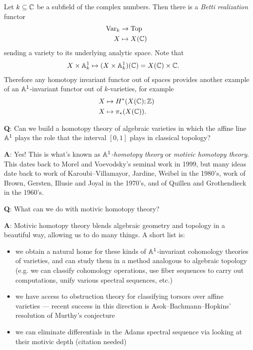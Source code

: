 \documentclass[11pt]{amsart}
\begin{document}
\begin{example} Let $k \subseteq \mathbb{C}$ be a subfield of the complex numbers. Then there is a \textit{Betti realization} functor
\begin{align*}
    \mathrm{Var}_k &\to \mathrm{Top} \\
    X &\mapsto X(\mathbb{C})
\end{align*}
sending a variety to its underlying analytic space. Note that
\begin{align*}
    X \times \mathbb{A}^1_k &\mapsto (X \times \mathbb{A}^1_k)(\mathbb{C}) = X(\mathbb{C}) \times \mathbb{C}.
\end{align*}
Therefore any homotopy invariant functor out of spaces provides another example of an $\mathbb{A}^1$-invariant functor out of $k$-varieties, for example
\begin{align*}
    X &\mapsto H^\ast(X(\mathbb{C});\mathbb{Z}) \\
    X &\mapsto \pi_\ast (X(\mathbb{C})).
\end{align*}
\end{example}


\textbf{Q}: Can we build a homotopy theory of algebraic varieties in which the affine line $\mathbb{A}^1$ plays the role that the interval $[0,1]$ plays in classical topology?

\textbf{A}: Yes! This is what's known as \textit{$\mathbb{A}^1$-homotopy theory} or \textit{motivic homotopy theory}. This dates back to Morel and Voevodsky's seminal work in 1999, but many ideas date back to work of Karoubi--Villamayor, Jardine, Weibel in the 1980's, work of Brown, Gersten, Illusie and Joyal in the 1970's, and of Quillen and Grothendieck in the 1960's.

\textbf{Q}: What can we do with motivic homotopy theory?

\textbf{A}: Motivic homotopy theory blends algebraic geometry and topology in a beautiful way, allowing us to do many things. A short list is:
\begin{itemize}
    \item we obtain a natural home for these kinds of $\mathbb{A}^1$-invariant cohomology theories of varieties, and can study them in a method analogous to algebraic topology (e.g. we can classify cohomology operations, use fiber sequences to carry out computations, unify various spectral sequences, etc.)
    \item we have access to obstruction theory for classifying torsors over affine varieties --- recent success in this direction is Asok--Bachmann--Hopkins' resolution of Murthy's conjecture
    \item we can eliminate differentials in the Adams spectral sequence via looking at their motivic depth (citation needed)
\end{itemize}
\end{document}
